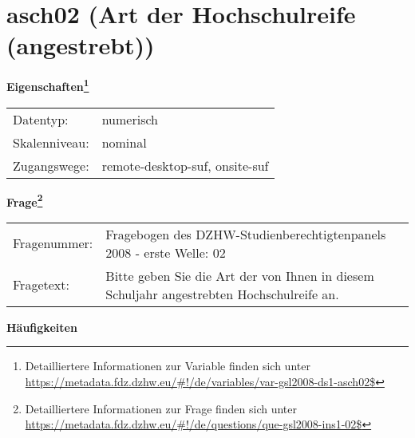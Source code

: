 
    \setcounter{footnote}{0}

    \vspace*{-1.8cm}
	\section{asch02 (Art der Hochschulreife (angestrebt))}
	\label{section:asch02}



    \vspace*{0.5cm}
    \noindent\textbf{Eigenschaften\footnote{Detailliertere Informationen zur Variable finden sich unter
		\url{https://metadata.fdz.dzhw.eu/\#!/de/variables/var-gsl2008-ds1-asch02$}}}\\
	\begin{tabularx}{\hsize}{@{}lX}
	Datentyp: & numerisch \\
	Skalenniveau: & nominal \\
	Zugangswege: &
	  remote-desktop-suf, 
	  onsite-suf
 \\
    \end{tabularx}



				\vspace*{0.5cm}
                \noindent\textbf{Frage\footnote{Detailliertere Informationen zur Frage finden sich unter
		              \url{https://metadata.fdz.dzhw.eu/\#!/de/questions/que-gsl2008-ins1-02$}}}\\
				\begin{tabularx}{\hsize}{@{}lX}
					Fragenummer: &
					  Fragebogen des DZHW-Studienberechtigtenpanels 2008 - erste Welle:
					  02
 \\
					Fragetext: & Bitte geben Sie die Art der von Ihnen in diesem Schuljahr angestrebten Hochschulreife an. \\
				\end{tabularx}





        		\vspace*{0.5cm}
                \noindent\textbf{Häufigkeiten}

